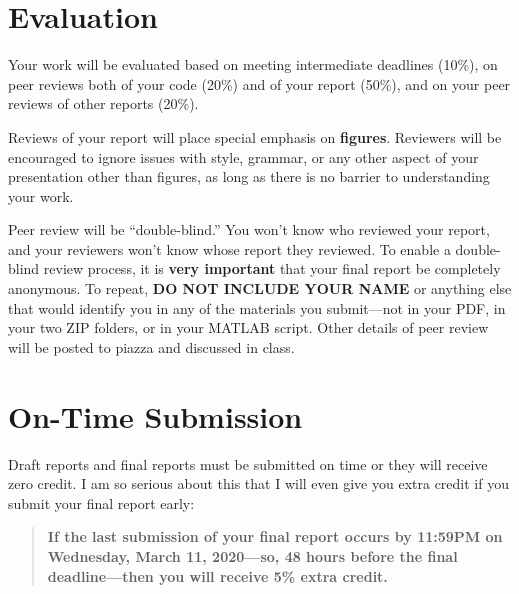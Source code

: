 \documentclass[conf]{new-aiaa}
\begin{document}
\section{Evaluation}

Your work will be evaluated based on meeting intermediate deadlines (10\%), on peer reviews both of your code (20\%) and of your report (50\%), and on your peer reviews of other reports (20\%).

Reviews of your report will place special emphasis on {\bf figures}. Reviewers will be encouraged to ignore issues with style, grammar, or any other aspect of your presentation other than figures, as long as there is no barrier to understanding your work.

Peer review will be ``double-blind.'' You won't know who reviewed your report, and your reviewers won't know whose report they reviewed. To enable a double-blind review process, it is \textbf{very important} that your final report be completely anonymous. To repeat, \textbf{DO NOT INCLUDE YOUR NAME} or anything else that would identify you in any of the materials you submit---not in your PDF, in your two ZIP folders, or in your MATLAB script. Other details of peer review will be posted to piazza and discussed in class.


\section{On-Time Submission}

Draft reports and final reports must be submitted on time or they will receive zero credit. I am so serious about this that I will even give you extra credit if you submit your final report early:
\begin{quote}
\textbf{If the last submission of your final report occurs by 11:59PM on Wednesday, March 11, 2020---so, 48 hours before the final deadline---then you will receive 5\% extra credit.}
\end{quote}
\end{document}
